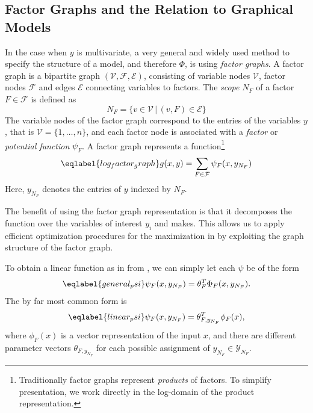 \subsection{Factor Graphs and the Relation to Graphical Models}
In the case when $y$ is multivariate, a very general and widely used method to
specify the structure of a model, and therefore $\Phi$, is using \emph{factor
graphs}. A factor graph is a bipartite graph $(\mathcal{V}, \mathcal{F},
\mathcal{E})$, consisting of variable nodes $\mathcal{V}$, factor nodes
$\mathcal{F}$ and edges $\mathcal{E}$ connecting variables to factors. The
\emph{scope} $N_F$ of a factor $F \in \mathcal{F}$ is defined as
\begin{equation}
    N_F = \{ v \in \mathcal{V} \,|\, (v,F) \in \mathcal{E} \}
\end{equation}
The variable nodes of the factor graph correspond to the entries of the
variables $y$, that is $\mathcal{V} = \{1, \dotsc, n\}$, and each factor node
is associated with a \emph{factor} or \emph{potential function} $\psi_F$.
A factor graph represents a function\footnote{Traditionally factor graphs
 represent \emph{products} of factors.  To simplify presentation, we work
directly in the log-domain of the product representation.}
\begin{equation}\eqlabel{log_factor_graph}
    g(x, y) = \sum_{F \in \mathcal{F}} \psi_F(x, y_{N_F})
\end{equation}
Here, $y_{N_F}$ denotes the entries of $y$ indexed by $N_F$.

The benefit of using the factor graph representation is that it decomposes the
function over the variables of interest $y_i$ and makes. This allows us to
apply efficient optimization procedures for the maximization in
 by exploiting the graph structure of the factor graph.

To obtain a linear function as in  from
, we can simply let each $\psi$ be of the form
\begin{equation}\eqlabel{general_psi}
    \psi_F(x, y_{N_F}) = \theta_F^T \Phi_F(x, y_{N_F}).
\end{equation}
The by far most common form is 
\begin{equation}\eqlabel{linear_psi}
    \psi_F(x, y_{N_F}) = \theta_{F, y_{N_F}}^T \phi_F(x),
\end{equation}
where $\phi_F(x)$ is a vector representation of the input $x$, and there are
different parameter vectors $\theta_{F, y_{N_F}}$ for each possible assignment
of $y_{N_F} \in \mathcal{Y}_{N_F}$.

